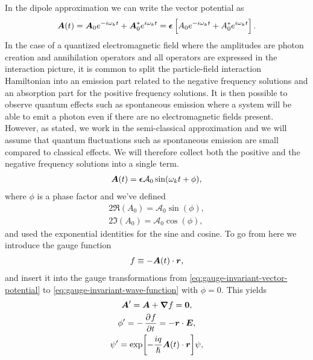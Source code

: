             In the dipole approximation we can write the vector potential as
            \begin{align}
                \boldsymbol{A}(t)
                = \boldsymbol{A}_0 e^{-i\omega_k t}
                + \boldsymbol{A}^{*}_{0} e^{i\omega_k t}
                = \boldsymbol{\epsilon}\left[ 
                    A_0 e^{-i\omega_k t}
                    + A^{*}_0 e^{i\omega_k t}
                 \right].
            \end{align}
            In the case of a quantized electromagnetic field where the
            amplitudes are photon creation and annihilation operators and all
            operators are expressed in the interaction picture, it is common to
            split the particle-field interaction Hamiltonian into an emission
            part related to the negative frequency solutions and an absorption
            part for the positive frequency solutions.
            It is then possible to observe quantum effects such as spontaneous
            emission where a system will be able to emit a photon even if there
            are no electromagnetic fields present.
            However, as stated, we work in the semi-classical approximation and
            we will assume that quantum fluctuations such as spontaneous
            emission are small compared to classical effects.
            We will therefore collect both the positive and the negative
            frequency solutions into a single term.
            \begin{align}
                \boldsymbol{A}(t)
                = \boldsymbol{\epsilon}\mathcal{A}_0\sin(\omega_k t + \phi),
            \end{align}
            where $\phi$ is a phase factor and we've defined
            \begin{gather}
                2\Re(A_0) = \mathcal{A}_0\sin(\phi), \\
                2\Im(A_0) = \mathcal{A}_0\cos(\phi),
            \end{gather}
            and used the exponential identities for the sine and cosine.
            To go from here we introduce the gauge function
            \begin{align}
                f \equiv - \boldsymbol{A}(t)\cdot\boldsymbol{r},
            \end{align}
            and insert it into the gauge transformations from
            \autoref{eq:gauge-invariant-vector-potential} to
            \autoref{eq:gauge-invariant-wave-function} with $\phi = 0$.
            This yields
            \begin{gather}
                \vfg{A}'
                = \vfg{A} + \vfg{\nabla}f
                = \vfg{0}, \\
                \phi'
                = -\dpd{f}{t}
                = -\vfg{r}\cdot\vfg{E}, \\
                \psi'
                = \exp[-\frac{iq}{\hslash}\vfg{A}(t)\cdot\vfg{r}]\psi,
            \end{gather}
